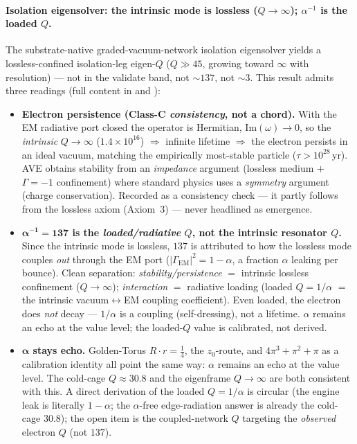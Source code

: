 \paragraph{Isolation eigensolver: the intrinsic mode is lossless ($Q\to\infty$); $\alpha^{-1}$ is the loaded $Q$.}
The substrate-native graded-vacuum-network isolation eigensolver yields a lossless-confined isolation-leg eigen-$Q$ ($Q\gg45$, growing toward $\infty$ with resolution) --- not in the validate band, not $\sim137$, not $\sim3$. This result admits three readings (full content in  and ):
\begin{itemize}
  \item \textbf{Electron persistence (Class-C \emph{consistency}, not a chord).} With the EM radiative port closed the operator is Hermitian, $\mathrm{Im}(\omega)\to0$, so the \emph{intrinsic} $Q\to\infty$ ($1.4\times10^{16}$) $\Rightarrow$ infinite lifetime $\Rightarrow$ the electron persists in an ideal vacuum, matching the empirically most-stable particle ($\tau>10^{28}\,$yr). AVE obtains stability from an \emph{impedance} argument (lossless medium $+$ $\Gamma=-1$\gammaundeclared{} confinement) where standard physics uses a \emph{symmetry} argument (charge conservation). Recorded as a consistency check --- it partly follows from the lossless axiom (Axiom~3) --- never headlined as emergence.
  \item \textbf{$\boldsymbol{\alpha^{-1}=137}$ is the \emph{loaded/radiative} $Q$, not the intrinsic resonator $Q$.} Since the intrinsic mode is lossless, $137$ is attributed to how the lossless mode couples \emph{out} through the EM port ($|\Gamma_{\mathrm{EM}}|^2=1-\alpha$, a fraction $\alpha$ leaking per bounce). Clean separation: \emph{stability/persistence} $=$ intrinsic lossless confinement ($Q\to\infty$); \emph{interaction} $=$ radiative loading (loaded $Q=1/\alpha$ $=$ the intrinsic vacuum$\leftrightarrow$EM coupling coefficient). Even loaded, the electron does \emph{not} decay --- $1/\alpha$ is a coupling (self-dressing), not a lifetime. $\alpha$ remains an echo at the value level; the loaded-$Q$ value is calibrated, not derived.
  \item \textbf{$\boldsymbol{\alpha}$ stays echo.} Golden-Torus $R\cdot r=\tfrac14$, the $z_0$-route, and $4\pi^3+\pi^2+\pi$ as a calibration identity all point the same way: $\alpha$ remains an echo at the value level. The cold-cage $Q\approx30.8$ and the eigenframe $Q\to\infty$ are both consistent with this. A direct derivation of the loaded $Q=1/\alpha$ is circular (the engine leak is literally $1-\alpha$; the $\alpha$-free edge-radiation answer is already the cold-cage $30.8$); the open item is the coupled-network $Q$ targeting the \emph{observed} electron $Q$ (not $137$).
\end{itemize}

